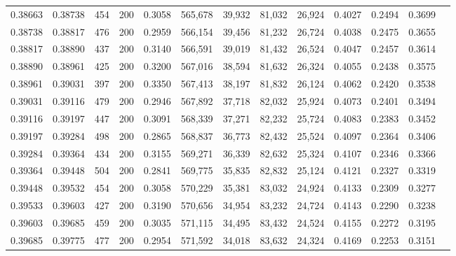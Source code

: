 \begin{tabular}{rrrrrrrrrrrrr}
0.38663 & 0.38738 &   454 & 200 &                                     0.3058 & 565,678 &  39,932 &  81,032 &  26,924 & 0.4027 & 0.2494 & 0.3699 \\
0.38738 & 0.38817 &   476 & 200 &                                     0.2959 & 566,154 &  39,456 &  81,232 &  26,724 & 0.4038 & 0.2475 & 0.3655 \\
0.38817 & 0.38890 &   437 & 200 &                                     0.3140 & 566,591 &  39,019 &  81,432 &  26,524 & 0.4047 & 0.2457 & 0.3614 \\
0.38890 & 0.38961 &   425 & 200 &                                     0.3200 & 567,016 &  38,594 &  81,632 &  26,324 & 0.4055 & 0.2438 & 0.3575 \\
0.38961 & 0.39031 &   397 & 200 &                                     0.3350 & 567,413 &  38,197 &  81,832 &  26,124 & 0.4062 & 0.2420 & 0.3538 \\
0.39031 & 0.39116 &   479 & 200 &                                     0.2946 & 567,892 &  37,718 &  82,032 &  25,924 & 0.4073 & 0.2401 & 0.3494 \\
0.39116 & 0.39197 &   447 & 200 &                                     0.3091 & 568,339 &  37,271 &  82,232 &  25,724 & 0.4083 & 0.2383 & 0.3452 \\
0.39197 & 0.39284 &   498 & 200 &                                     0.2865 & 568,837 &  36,773 &  82,432 &  25,524 & 0.4097 & 0.2364 & 0.3406 \\
0.39284 & 0.39364 &   434 & 200 &                                     0.3155 & 569,271 &  36,339 &  82,632 &  25,324 & 0.4107 & 0.2346 & 0.3366 \\
0.39364 & 0.39448 &   504 & 200 &                                     0.2841 & 569,775 &  35,835 &  82,832 &  25,124 & 0.4121 & 0.2327 & 0.3319 \\
0.39448 & 0.39532 &   454 & 200 &                                     0.3058 & 570,229 &  35,381 &  83,032 &  24,924 & 0.4133 & 0.2309 & 0.3277 \\
0.39533 & 0.39603 &   427 & 200 &                                     0.3190 & 570,656 &  34,954 &  83,232 &  24,724 & 0.4143 & 0.2290 & 0.3238 \\
0.39603 & 0.39685 &   459 & 200 &                                     0.3035 & 571,115 &  34,495 &  83,432 &  24,524 & 0.4155 & 0.2272 & 0.3195 \\
0.39685 & 0.39775 &   477 & 200 &                                     0.2954 & 571,592 &  34,018 &  83,632 &  24,324 & 0.4169 & 0.2253 & 0.3151 \\

\end{tabular}
